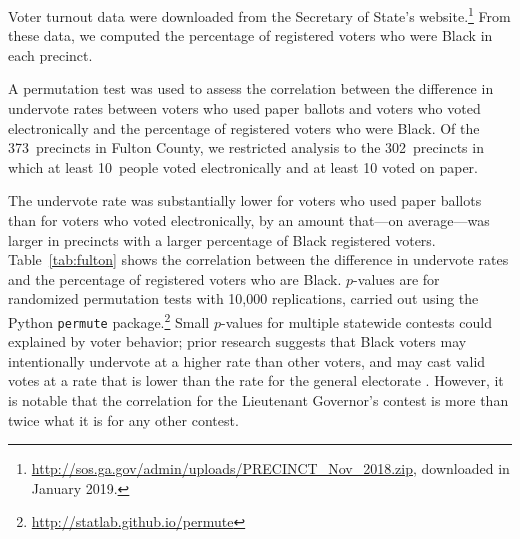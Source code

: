 \documentclass[runningheads]{llncs}
\begin{document}
Voter turnout data were downloaded from the Secretary of State's website.\footnote{%
\url{http://sos.ga.gov/admin/uploads/PRECINCT_Nov_2018.zip}, downloaded in January 2019.
}%
From these data, we computed the percentage of registered voters who were Black in each precinct.

A permutation test was used to assess the correlation
between the difference in undervote rates between voters who used paper ballots and voters who voted electronically and the percentage of registered voters who were Black.
Of the 373~precincts in Fulton County, we restricted analysis to the 302~precincts
in which at least 10~people voted electronically and at least 10 voted on paper.

The undervote rate was substantially lower for voters who used paper ballots than for voters who voted 
electronically, by an amount that---on average---was larger in precincts with a larger percentage of
Black registered voters.
Table~\ref{tab:fulton} shows the correlation between the difference in undervote rates and the percentage of registered voters who are Black.
$p$-values are for randomized permutation tests with 10,000 replications,
carried out using the Python \texttt{permute} package.\footnote{%
\url{http://statlab.github.io/permute}
}%
Small $p$-values for multiple statewide contests could explained by
voter behavior; prior research suggests that Black voters may intentionally undervote at a higher rate than other voters, and may cast valid votes at a rate that is lower than the rate for the general electorate \cite{herron2003overvoting,tomz2003does}.
However, it is notable that the correlation for the Lieutenant Governor's contest is more than twice what it is for any other contest. 
\end{document}
